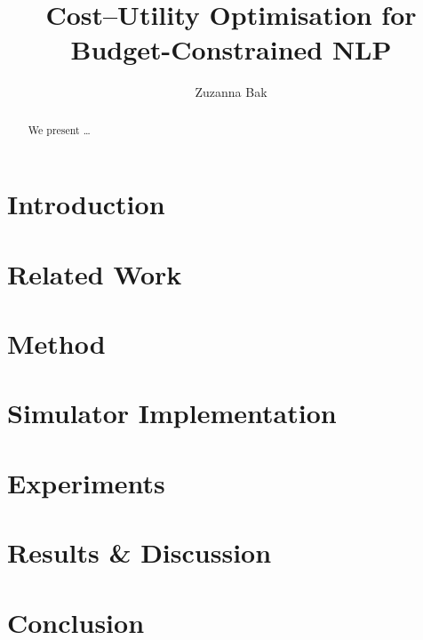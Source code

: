 \documentclass[11pt]{article}
\title{Cost–Utility Optimisation for Budget-Constrained NLP}
\author{Zuzanna Bak}
\begin{document}
\maketitle
\begin{abstract}We present …\end{abstract}
\section{Introduction}\section{Related Work}\section{Method}
\section{Simulator Implementation}\section{Experiments}
\section{Results \& Discussion}\section{Conclusion}

\end{document}
